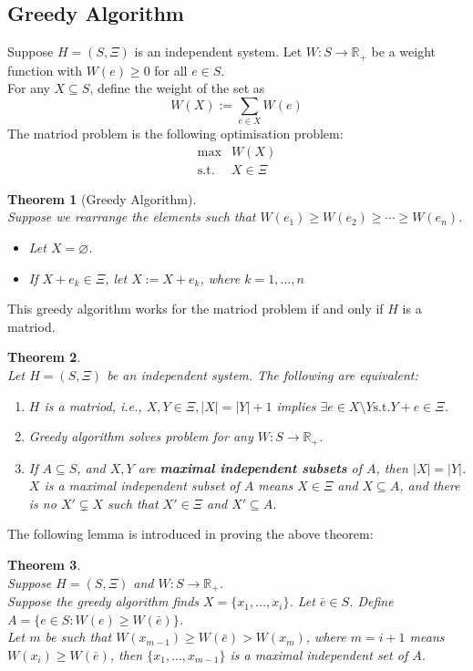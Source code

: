 \documentclass[12pt]{article}
\newcommand{\st}{\mathrm{s.t.}}
\newtheorem{theorem}{Theorem}[section]
\theoremstyle{definition}
\begin{document}
\subsection{Greedy Algorithm}
Suppose $H=(S,\Xi)$ is an independent system. Let $W:S\to\mathbb{R}_{+}$ be a weight function with $W(e)\geq 0$ for all $e\in S$.\\
For any $X\subseteq S$, define the weight of the set as
\[
W(X):=\sum_{e\in X} W(e)
\]
The matriod problem is the following optimisation problem:
\begin{align*}
\max& W(X)\\
\st & X\in\Xi
\end{align*}
\begin{theorem}[Greedy Algorithm]
\hfill\\\normalfont Suppose we rearrange the elements such that $W(e_1)\geq W(e_2)\geq\cdots\geq W(e_n)$.
\begin{itemize}
  \item[Step 0] Let $X=\varnothing$.
  \item[Step $k$] If $X+e_k\in\Xi$, let $X:=X+e_k$, where $k=1,\ldots, n$
\end{itemize}
\end{theorem}
This greedy algorithm works for the matriod problem if and only if $H$ is a matriod.
\begin{theorem}
\hfill\\\normalfont Let $H=(S,\Xi)$ be an independent system. The following are equivalent:
\begin{enumerate}
  \item $H$ is a matriod, i.e., $X,Y\in\Xi,|X|=|Y|+1$ implies $\exists e\in X\setminus Y\st Y+e\in\Xi$.
  \item Greedy algorithm solves problem for any $W:S\to\mathbb{R}_{+}$.
  \item If $A\subseteq S$, and $X,Y$ are \textbf{maximal independent subsets} of $A$, then $|X|=|Y|$.\\
  $X$ is a maximal independent subset of $A$ means $X\in\Xi$ and $X\subseteq A$, and there is no $X'\subsetneq X$ such that $X'\in\Xi$ and $X'\subseteq A$. 
\end{enumerate}
\end{theorem}
The following lemma is introduced in proving the above theorem:
\begin{theorem}
\hfill\\\normalfont Suppose $H=(S,\Xi)$ and $W:S\to\mathbb{R}_{+}$.\\
Suppose the greedy algorithm finds $X=\{x_1,\ldots, x_i\}$.
Let $\bar{e}\in S$. Define $A=\{e\in S:W(e)\geq W(\bar{e})\}$.\\
Let $m$ be such that $W(x_{m-1})\geq W(\bar{e})> W(x_m)$, where $m=i+1$ means $W(x_i)\geq W(\bar{e})$, then $\{x_1,\ldots, x_{m-1}\}$ is a maximal independent set of $A$.
\end{theorem}
\end{document}
